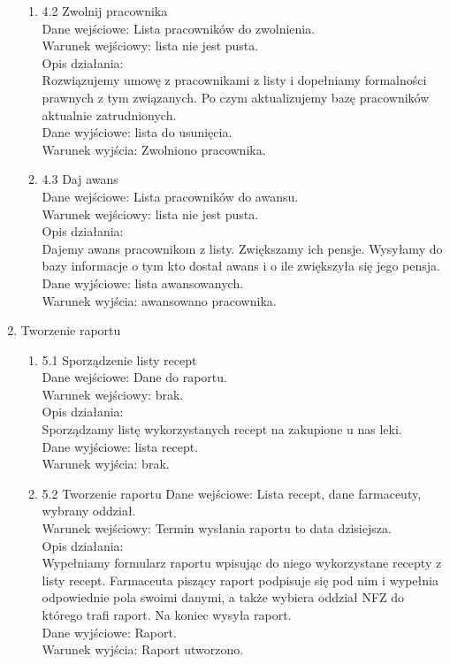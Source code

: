 \documentclass[a4paper, 11pt]{article}
\begin{document}
\begin{enumerate}
\begin{enumerate}
		\item 4.2 Zwolnij pracownika\\
	Dane wejściowe: Lista pracowników do zwolnienia.\\
	Warunek wejściowy: lista nie jest pusta.\\
	Opis działania:\\
		Rozwiązujemy umowę z pracownikami z listy i dopełniamy formalności prawnych z tym związanych. Po czym aktualizujemy bazę pracowników aktualnie zatrudnionych. \\
		
	Dane wyjściowe: lista do usunięcia.\\
	Warunek wyjścia: Zwolniono pracownika.\\
		
		\item 4.3 Daj awans	\\
	Dane wejściowe: Lista pracowników do awansu.\\
	Warunek wejściowy: lista nie jest pusta.\\
	Opis działania:\\
		Dajemy awans pracownikom z listy. Zwiększamy ich pensje. Wysyłamy  do bazy informacje o tym kto dostał awans i o ile zwiększyła się jego pensja.\\
		
	Dane wyjściowe: lista awansowanych.\\
	Warunek wyjścia: awansowano pracownika.\\
	\end{enumerate}
		
	\item  Tworzenie raportu
		\begin{enumerate}
		\item 5.1 Sporządzenie listy recept\\
		Dane wejściowe: Dane do raportu.\\
		Warunek wejściowy: brak.\\
		Opis działania:\\
		Sporządzamy listę wykorzystanych recept na zakupione u nas leki.\\
		
		Dane wyjściowe: lista recept.\\
		Warunek wyjścia: brak.
		\item 5.2 Tworzenie raportu
		Dane wejściowe: Lista recept, dane farmaceuty, wybrany oddział.\\
		Warunek wejściowy: Termin wysłania raportu to data dzisiejsza.\\
		Opis działania:\\
			Wypełniamy formularz raportu wpisując do niego wykorzystane recepty z listy recept. Farmaceuta piszący raport podpisuje się pod nim i wypełnia odpowiednie pola swoimi danymi, a także wybiera oddział NFZ do którego trafi raport. Na koniec wysyła raport.\\
			
		Dane wyjściowe: Raport.\\
		Warunek wyjścia: Raport utworzono.\\
		\end{enumerate}
	
	\end{enumerate}
\end{document}
